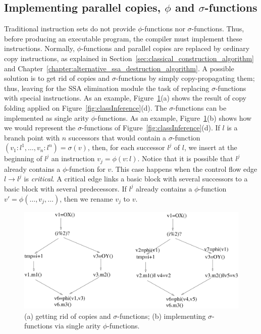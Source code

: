 \subsection{Implementing parallel copies, $\phi$ and $\sigma$-functions}
\label{sub:special}
Traditional instruction sets do not provide $\phi$-functions nor $\sigma$-functions.
Thus, before producing an executable program, the compiler must implement these instructions.
Normally, $\phi$-functions and parallel copies are replaced by ordinary copy instructions, as explained in Section~\ref{sec:classical_construction_algorithm} and Chapter~\ref{chapter:alternative_ssa_destruction_algorithm}.
A possible solution is to get rid of copies and $\sigma$-functions by simply copy-propagating them; thus, leaving for the SSA elimination module the task of replacing $\sigma$-functions with special instructions.
As an example, Figure~\ref{fig:sigImpl}(a) shows the result of copy folding applied on Figure~\ref{fig:classInference}(d). 
The $\sigma$-functions can be implemented as single arity $\phi$-functions.
As an example, Figure~\ref{fig:sigImpl}(b) shows how we would represent the $\sigma$-functions of Figure~\ref{fig:classInference}(d). 
If $l$ is a branch point with $n$ successors that would contain a $\sigma$-function $(v_1:l^1, \ldots, v_n:l^n) =\sigma(v)$, then, for each successor $l^j$ of $l$, we insert at the beginning of $l^j$ an instruction $v_j = \phi(v:l)$.
Notice that it is possible that $l^j$ already contains a $\phi$-function for $v$.
This case happens when the control flow edge $l \rightarrow l^j$ is {\em critical}.
A critical edge links a basic block with several successors to a basic block with several predecessors.
If $l^j$ already contains a $\phi$-function $v' = \phi(\ldots, v_j, \ldots)$, then we rename $v_j$ to $v$.


\begin{figure}[t!]
\centering
\includegraphics[width=\textwidth]{sigImpl}
\caption{(a) getting rid of copies and $\sigma$-functions; (b) implementing $\sigma$-functions via single arity $\phi$-functions.}
\label{fig:sigImpl}
\end{figure}



